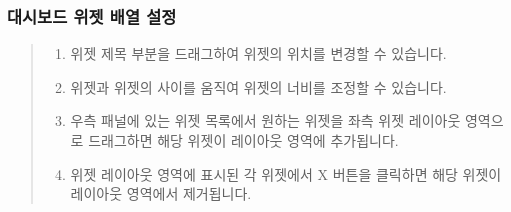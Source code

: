 \documentclass[letterpaper,10pt,english]{sphinxmanual}
\begin{document}
\subsubsection{대시보드 위젯 배열 설정}
\label{\detokenize{discovery/part04/change_dashboard_layout_and_size:id2}}\begin{quote}

\begin{figure}[H]
\centering

\noindent{}
\end{figure}
\begin{enumerate}
\def\theenumi{\arabic{enumi}}
\def\labelenumi{\theenumi .}
\makeatletter\def\p@enumii{\p@enumi \theenumi .}\makeatother
\item {} 
 위젯 제목 부분을 드래그하여 위젯의 위치를 변경할 수 있습니다.

\item {} 
 위젯과 위젯의 사이를 움직여 위젯의 너비를 조정할 수 있습니다.

\item {} 
 우측 패널에 있는 위젯 목록에서 원하는 위젯을 좌측 위젯 레이아웃 영역으로 드래그하면 해당 위젯이 레이아웃 영역에 추가됩니다.

\item {} 
 위젯 레이아웃 영역에 표시된 각 위젯에서 X 버튼을 클릭하면 해당 위젯이 레이아웃 영역에서 제거됩니다.

\end{enumerate}
\end{quote}
\end{document}
